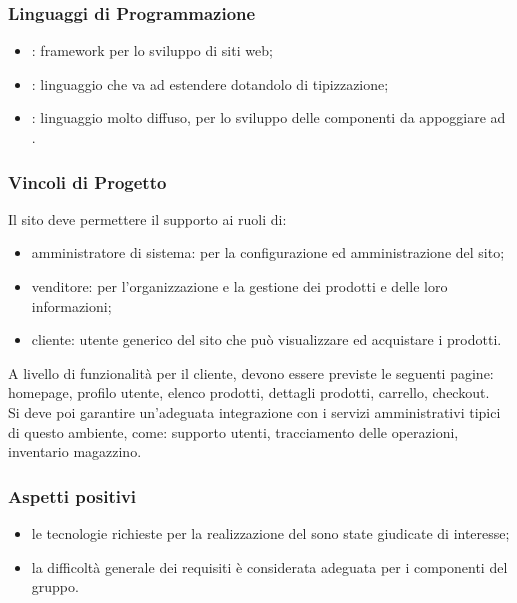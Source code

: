 \documentclass[]{article}
\begin{document}
			\subsubsection{Linguaggi di Programmazione}
			\begin{itemize}
				\item \textsc{:} framework per lo sviluppo  di siti web;
				\item \textsc{:} linguaggio che va ad estendere  dotandolo di tipizzazione;
				\item \textsc{:} linguaggio molto diffuso, per lo sviluppo delle componenti  da appoggiare ad .
			\end{itemize}


			\subsubsection{Vincoli di Progetto}
			Il sito deve permettere il supporto ai ruoli di:
			\begin{itemize}
			    \item amministratore di sistema: per la configurazione ed  amministrazione del sito;
			    \item venditore: per l'organizzazione e la gestione dei prodotti e delle loro informazioni;
			    \item cliente: utente generico del sito che può visualizzare ed acquistare i prodotti.
			\end{itemize}
		A livello di funzionalità per il cliente, devono essere previste le seguenti pagine:  homepage, profilo utente, elenco prodotti, dettagli prodotti, carrello, checkout.\\
		Si deve poi garantire un'adeguata integrazione con i servizi amministrativi tipici di questo ambiente, come: supporto utenti, tracciamento delle operazioni, inventario magazzino.\\

			\subsubsection{Aspetti positivi}
			\begin{itemize}
				\item le tecnologie richieste per la realizzazione del  sono state giudicate di interesse;
				\item la difficoltà generale dei requisiti è considerata adeguata per i componenti del gruppo.
			\end{itemize}
\end{document}
